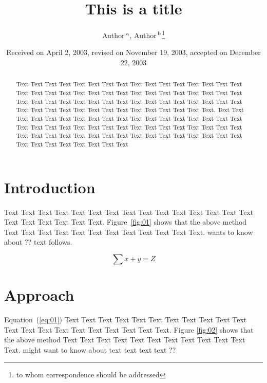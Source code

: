 \documentclass{Rpd}
\begin{document}
\def\Sectitle{Section Title}%

\def\copyrightyear{2004}%

\title[short Title]{This is a title}
\author[Sample \textit{et~al}]{Author\,$^{\rm a}$, Author\,$^{\rm b}$\footnote{to whom correspondence should be addressed}}
\address{$^{\rm a}$Address followed, $^{\rm b}$Address followed}

\date{Received on April 2, 2003, revised on November 19, 2003,
  accepted on December 22, 2003}

\begin{abstract}
Text Text Text  Text Text Text Text Text Text Text Text
Text  Text Text Text Text Text Text Text Text Text  Text Text Text Text Text Text Text Text Text  Text Text Text Text Text Text Text Text Text  Text Text Text Text Text Text Text Text Text  Text Text Text Text Text Text Text Text Text  Text Text Text Text Text.
Text  Text Text Text Text Text Text Text Text Text  Text Text Text Text Text Text Text Text Text  Text Text Text Text Text Text Text Text Text  Text Text Text Text Text Text
Text  Text Text Text Text Text Text Text Text Text  Text Text Text Text Text Text Text Text Text  Text Text Text Text Text
\end{abstract}

\maketitle


\section{Introduction}

Text Text Text Text Text Text  Text Text Text Text Text Text Text Text Text  Text Text Text Text Text Text. Figure~\ref{fig:01} shows that the above method  Text Text Text Text  Text Text Text Text Text Text  Text Text.  \cite{Bag01} wants to know about ?? text follows.

\begin{equation} 
\sum x+ y =Z\label{eq:01}
\end{equation}


\section{Approach}

Equation~(\ref{eq:01}) Text Text Text Text Text Text  Text Text Text Text Text Text Text Text Text  Text Text Text Text Text Text. Figure \ref{fig:02} shows that the above method  Text Text Text Text  Text Text Text Text Text Text  Text Text.  \cite{Boffelli03} might want to know about  text text text text ??
\end{document}
